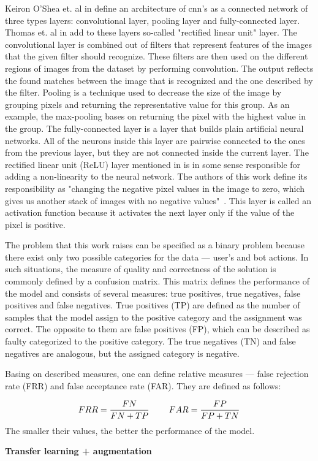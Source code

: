 Keiron O'Shea et. al in \cite{cnn-description} define an architecture of \gls{cnn}'s as a connected network of three types layers: convolutional layer, pooling layer and fully-connected layer.
Thomas et. al in \cite{thomas2020machine} add to these layers so-called "rectified linear unit" layer.
The convolutional layer is combined out of filters that represent features of the images that the given filter should recognize.
These filters are then used on the different regions of images from the dataset by performing convolution.
The output reflects the found matches between the image that is recognized and the one described by the filter.
Pooling is a technique used to decrease the size of the image by grouping pixels and returning the representative value for this group.
As an example, the max-pooling bases on returning the pixel with the highest value in the group.
The fully-connected layer is a layer that builds plain artificial neural networks.
All of the neurons inside this layer are pairwise connected to the ones from the previous layer, but they are not connected inside the current layer.
The rectified linear unit (ReLU) layer mentioned in \cite{thomas2020machine} is in some sense responsible for adding a non-linearity to the neural network.
The authors of this work define its responsibility as "changing the negative pixel values in the image to zero, which gives us another stack of images with no negative values"~\cite{thomas2020machine}.
This layer is called an activation function because it activates the next layer only if the value of the pixel is positive.

The problem that this work raises can be specified as a binary problem because there exist only two possible categories for the data --- user's and bot actions.
In such situations, the measure of quality and correctness of the solution is commonly defined by a confusion matrix.
This matrix defines the performance of the model and consists of several measures: true positives, true negatives, false positives and false negatives.
True positives (TP) are defined as the number of samples that the model assign to the positive category and the assignment was correct.
The opposite to them are false positives (FP), which can be described as faulty categorized to the positive category.
The true negatives (TN) and false negatives are analogous, but the assigned category is negative.

Basing on described measures, one can define relative measures --- false rejection rate (FRR) and false acceptance rate (FAR).
They are defined as follows:

\[
    FRR = \frac{FN}{FN + TP} \hspace{8mm} FAR = \frac{FP}{FP + TN}
\]
The smaller their values, the better the performance of the model.

\textbf{Transfer learning + augmentation}
